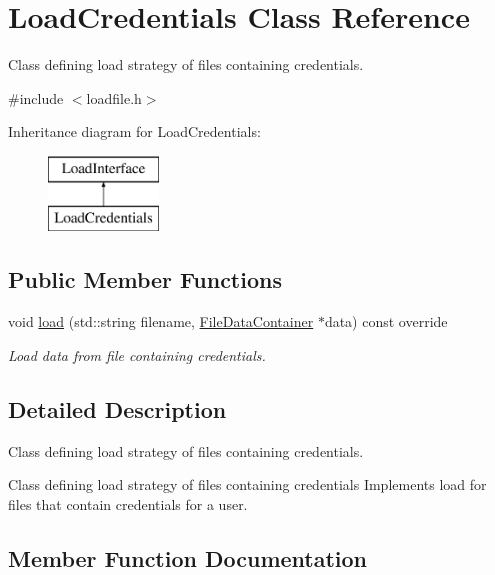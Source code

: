 \hypertarget{classLoadCredentials}{}\section{Load\+Credentials Class Reference}
\label{classLoadCredentials}


Class defining load strategy of files containing credentials.  




{\ttfamily \#include $<$loadfile.\+h$>$}

Inheritance diagram for Load\+Credentials\+:\begin{figure}[H]
\begin{center}
\leavevmode
\includegraphics[height=2.000000cm]{classLoadCredentials}
\end{center}
\end{figure}
\subsection*{Public Member Functions}
\begin{DoxyCompactItemize}
\item 
void \mbox{\hyperlink{classLoadCredentials_ac2501d106f98bc7b7939f2d153de9707}{load}} (std\+::string filename, \mbox{\hyperlink{classFileDataContainer}{File\+Data\+Container}} $\ast$data) const override
\begin{DoxyCompactList}\small\item\em Load data from file containing credentials. \end{DoxyCompactList}\end{DoxyCompactItemize}


\subsection{Detailed Description}
Class defining load strategy of files containing credentials. 

Class defining load strategy of files containing credentials Implements load for files that contain credentials for a user. 

\subsection{Member Function Documentation}
\mbox{\label{classLoadCredentials_ac2501d106f98bc7b7939f2d153de9707}} 
